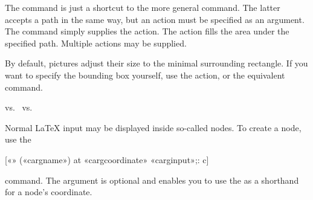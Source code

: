 The  command is just a shortcut to the more general  command.
The latter accepts a path in the same way, but
an action
must be specified as an argument. The  command simply
supplies the  action. The  action fills the area under
the specified path. Multiple actions may be supplied.
\begin{example}[vertical_mode, examplewidth=0.8\linewidth]
\end{example}

By default, \TikZ{} pictures adjust their size to the minimal surrounding
rectangle. If you want to specify the bounding box yourself, use the
 action, or the equivalent 
command.
\begin{chktexignore}
\begin{example}[vertical_mode, examplewidth=0.6\linewidth]
vs.\
vs.\
\end{example}
\end{chktexignore}

Normal \LaTeX{} input may be displayed inside so-called nodes. To create
a node, use the
\begin{lscommand}
  [«{}» («\bs carg{name}») at «\bs carg{coordinate}» {«\bs carg{input}»};: c]
\end{lscommand}
command. The \carg{name} argument is optional and enables you to use the
\carg{name} as a shorthand for a node's coordinate.

